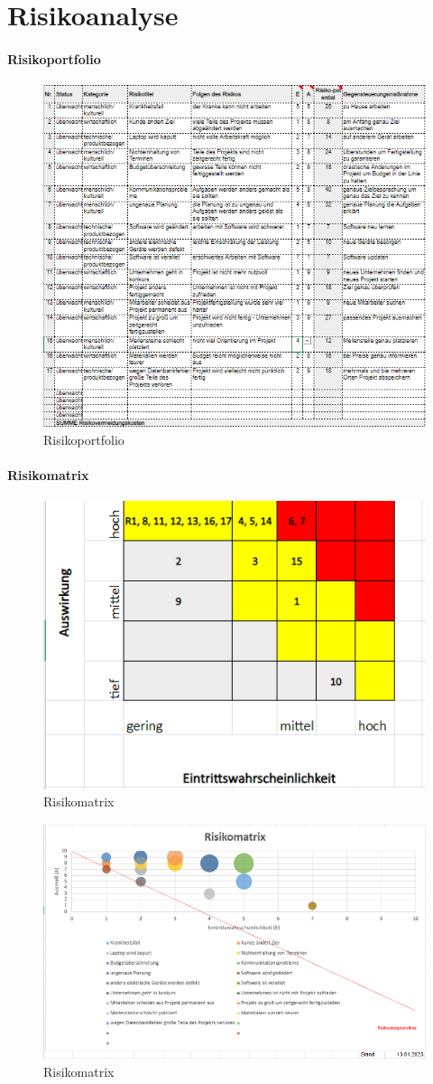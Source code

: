 \documentclass[ngerman]{report}
\begin{document}
\section{Risikoanalyse}

\paragraph{Risikoportfolio}

\begin{figure}[H]
\centering
\includegraphics[width=0.8\linewidth]{img_2.png}
\caption{Risikoportfolio}
\end{figure}

\newpage

\paragraph{Risikomatrix}

\begin{figure}[H]
\centering
\includegraphics[width=0.8\linewidth]{img_3.png}
\caption{Risikomatrix}
\end{figure}

\begin{figure}[H]
\centering
\includegraphics[width=0.8\linewidth]{img_4.png}
\caption{Risikomatrix}
\end{figure}
\end{document}
